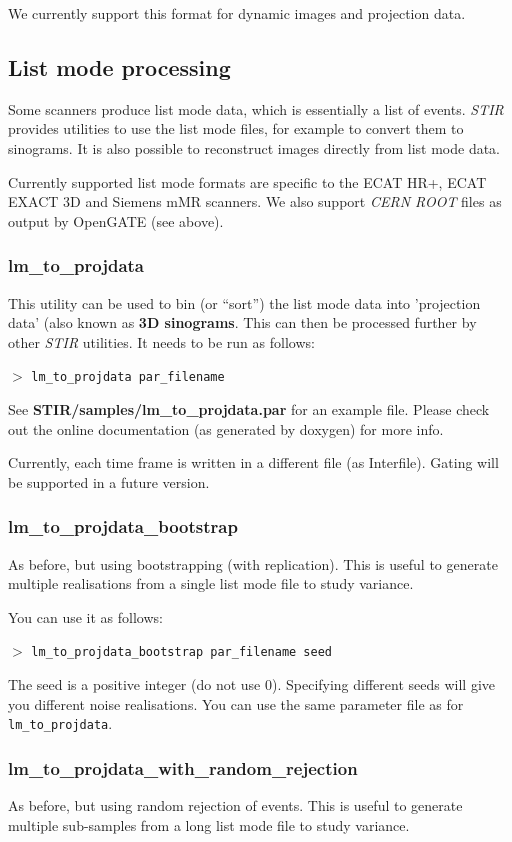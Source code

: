 \documentclass{article}
\newcommand{\cmdline}[1]{\par \noindent $>$ \texttt{#1}\par}
\begin{document}
We currently support this format for dynamic images and projection data.
\subsection{
List mode processing}

Some scanners produce list mode data, which is essentially a 
list of events. \textit{STIR} provides utilities to use
the list mode files, for example to convert them to sinograms. It is
also possible to reconstruct images directly from list mode data.

Currently supported list mode formats are specific to the ECAT 
HR+, ECAT EXACT 3D and Siemens mMR scanners. We also support \textit{CERN ROOT} files
as output by OpenGATE (see above).

\subsubsection{
lm\_to\_projdata}

This utility can be used to bin (or ``sort'') the list mode data 
into 'projection data' (also known as \textbf{3D sinograms}. 
This can then be processed further by other \textit{STIR} utilities. It 
needs to be run as follows:

\cmdline{lm\_to\_projdata par\_filename}


See \textbf{STIR/samples/lm\_to\_projdata.par} for an example file. Please 
check out the online documentation (as generated by doxygen) 
for more info.

Currently, each time frame is written in a different file (as Interfile). Gating 
will be supported in a future version.

\subsubsection{
lm\_to\_projdata\_bootstrap}
As before, but using bootstrapping (with replication). This is useful to generate multiple realisations 
from a single list mode file to study variance.

You can use it as follows:

\cmdline{lm\_to\_projdata\_bootstrap par\_filename seed}

The seed is a positive integer (do not use $0$). Specifying different seeds will give you different noise realisations.
You can use the same parameter file as for \texttt{lm\_to\_projdata}.

\subsubsection{
lm\_to\_projdata\_with\_random\_rejection}
As before, but using random rejection of events. This is useful to generate multiple sub-samples 
from a long list mode file to study variance.
\end{document}
